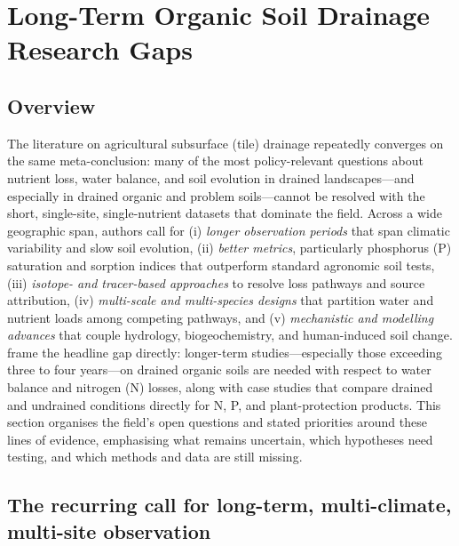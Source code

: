 \documentclass[11pt]{article}
\begin{document}
\section*{Long-Term Organic Soil Drainage Research Gaps}

\subsection{Overview}

The literature on agricultural subsurface (tile) drainage repeatedly converges on the same meta-conclusion: many of the most policy-relevant questions about nutrient loss, water balance, and soil evolution in drained landscapes---and especially in drained organic and problem soils---cannot be resolved with the short, single-site, single-nutrient datasets that dominate the field. Across a wide geographic span, authors call for (i) \emph{longer observation periods} that span climatic variability and slow soil evolution, (ii) \emph{better metrics}, particularly phosphorus (P) saturation and sorption indices that outperform standard agronomic soil tests, (iii) \emph{isotope- and tracer-based approaches} to resolve loss pathways and source attribution, (iv) \emph{multi-scale and multi-species designs} that partition water and nutrient loads among competing pathways, and (v) \emph{mechanistic and modelling advances} that couple hydrology, biogeochemistry, and human-induced soil change. \textcite{Gramlich2018} frame the headline gap directly: longer-term studies---especially those exceeding three to four years---on drained organic soils are needed with respect to water balance and nitrogen (N) losses, along with case studies that compare drained and undrained conditions directly for N, P, and plant-protection products. This section organises the field's open questions and stated priorities around these lines of evidence, emphasising what remains uncertain, which hypotheses need testing, and which methods and data are still missing.

\subsection{The recurring call for long-term, multi-climate, multi-site observation}
\end{document}

